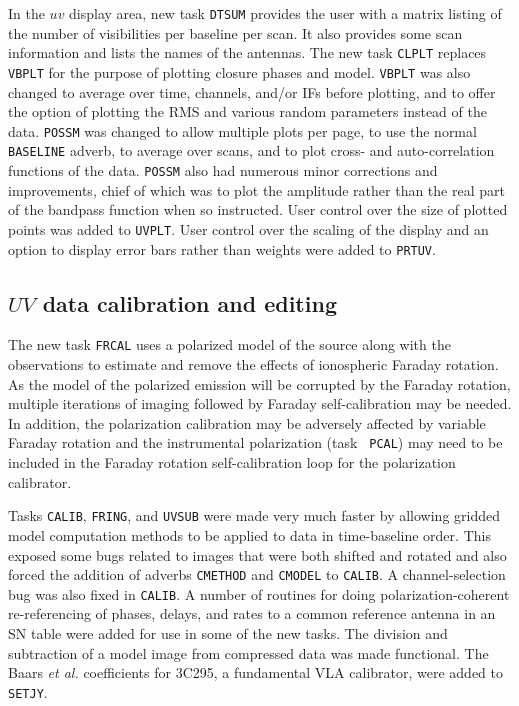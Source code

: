 In the $uv$ display area, new task {\tt DTSUM} provides the user with
a matrix listing of the number of visibilities per baseline per scan.
It also provides some scan information and lists the names of the
antennas.  The new task {\tt CLPLT} replaces {\tt VBPLT} for the
purpose of plotting closure phases and model.  {\tt VBPLT} was also
changed to average over time, channels, and/or IFs before plotting,
and to offer the option of plotting the RMS and various random
parameters instead of the data.  {\tt POSSM} was changed to allow
multiple plots per page, to use the normal {\tt BASELINE} adverb, to
average over scans, and to plot cross- and auto-correlation functions
of the data.  {\tt POSSM} also had numerous minor corrections and
improvements, chief of which was to plot the amplitude rather than the
real part of the bandpass function when so instructed.  User control
over the size of plotted points was added to \hbox{{\tt UVPLT}}.  User
control over the scaling of the display and an option to display error
bars rather than weights were added to \hbox{{\tt PRTUV}}.

\subsection{$UV$ data calibration and editing}

The new task {\tt FRCAL} uses a polarized model of the source along
with the observations to estimate and remove the effects of
ionospheric Faraday rotation.  As the model of the polarized emission
will be corrupted by the Faraday rotation, multiple iterations of
imaging followed by Faraday self-calibration may be needed.  In
addition, the polarization calibration may be adversely affected by
variable Faraday rotation and the instrumental polarization (task {\tt
PCAL}) may need  to be included in the Faraday rotation
self-calibration loop for the polarization calibrator.

Tasks {\tt CALIB}, {\tt FRING}, and {\tt UVSUB} were made very much
faster by allowing gridded model computation methods to be applied to
data in time-baseline order.  This exposed some bugs related to images
that were both shifted and rotated and also forced the addition of
adverbs {\tt CMETHOD} and {\tt CMODEL} to \hbox{{\tt CALIB}}.  A
channel-selection bug was also fixed in \hbox{{\tt CALIB}}.  A number
of routines for doing polarization-coherent re-referencing of phases,
delays, and rates to a common reference antenna in an SN table were
added for use in some of the new tasks.  The division and subtraction
of a model image from compressed data was made functional.  The Baars
{\it et al.} coefficients for 3C295, a fundamental VLA calibrator,
were added to \hbox{{\tt SETJY}}.

